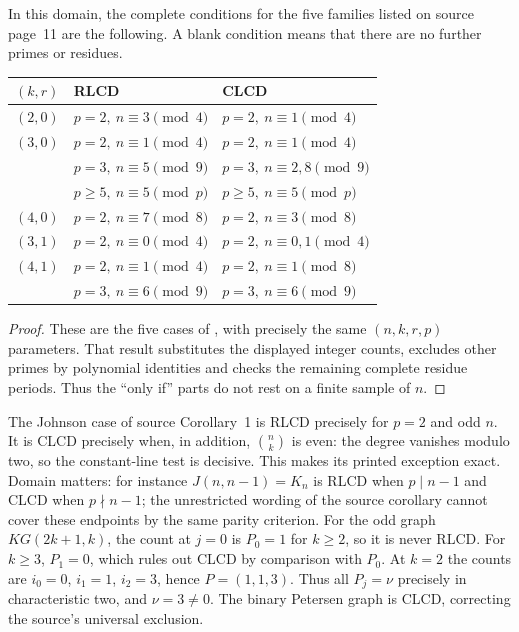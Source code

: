 \begin{corollary}\label{cor:subset-classification}
In this domain, the complete conditions for the five families listed
on source page~11 are the following. A blank condition means that there
are no further primes or residues.
\begin{center}\small
\begin{tabular}{lll}\toprule
$(k,r)$&RLCD&CLCD\\\midrule
$(2,0)$&$p=2,\ n\equiv3\pmod4$&$p=2,\ n\equiv1\pmod4$\\
$(3,0)$&$p=2,\ n\equiv1\pmod4$&$p=2,\ n\equiv1\pmod4$\\
&$p=3,\ n\equiv5\pmod9$&$p=3,\ n\equiv2,8\pmod9$\\
&$p\geq5,\ n\equiv5\pmod p$&$p\geq5,\ n\equiv5\pmod p$\\
$(4,0)$&$p=2,\ n\equiv7\pmod8$&$p=2,\ n\equiv3\pmod8$\\
$(3,1)$&$p=2,\ n\equiv0\pmod4$&$p=2,\ n\equiv0,1\pmod4$\\
$(4,1)$&$p=2,\ n\equiv1\pmod4$&$p=2,\ n\equiv1\pmod8$\\
&$p=3,\ n\equiv6\pmod9$&$p=3,\ n\equiv6\pmod9$\\\bottomrule
\end{tabular}
\end{center}
\end{corollary}
\begin{proof}
These are the five cases of , with precisely
the same $(n,k,r,p)$ parameters. That result substitutes the displayed
integer counts, excludes other primes by polynomial identities and
checks the remaining complete residue periods. Thus the ``only if''
parts do not rest on a finite sample of $n$.
\end{proof}

The Johnson case of source Corollary~1 is RLCD precisely for $p=2$ and
odd $n$. It is CLCD precisely when, in addition, $\binom nk$ is even:
the degree vanishes modulo two, so the constant-line test is decisive.
This makes its printed exception exact. Domain matters: for instance
$J(n,n-1)=K_n$ is RLCD when $p\mid n-1$ and CLCD when $p\nmid n-1$;
the unrestricted wording of the source corollary cannot cover these
endpoints by the same parity criterion.
For the odd graph $KG(2k+1,k)$, the count at $j=0$ is $P_0=1$ for
$k\geq2$, so it is never RLCD. For $k\geq3$, $P_1=0$, which rules out
CLCD by comparison with $P_0$. At $k=2$ the counts are
$i_0=0$, $i_1=1$, $i_2=3$, hence $P=(1,1,3)$.
Thus all $P_j=\nu$ precisely in characteristic two, and $\nu=3\ne0$.
The binary Petersen graph is CLCD, correcting the source's universal
exclusion.

